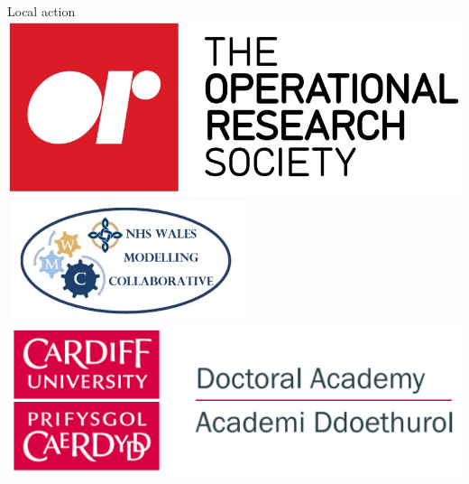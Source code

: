 \documentclass{beamer}
\begin{document}
\begin{frame}{Local action}
    \centering
    \includegraphics[width=.5\linewidth]{theorsociety.jpg}\\
    \vspace{10pt}
    \includegraphics[width=.5\linewidth]{wmc.png}\\
    \vspace{10pt}
    \includegraphics[width=.6\linewidth]{academy.png}
\end{frame}
\end{document}
